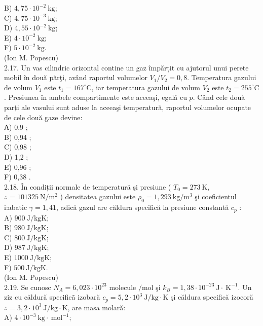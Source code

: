 B) $4,75 \cdot 10^{-2} \mathrm{~kg}$;\\
C) $4,75 \cdot 10^{-3} \mathrm{~kg}$;\\
D) $4,55 \cdot 10^{-2} \mathrm{~kg}$;\\
E) $4 \cdot 10^{-2} \mathrm{~kg}$;\\
F) $5 \cdot 10^{-2} \mathrm{~kg}$.\\
(Ion M. Popescu)\\
2.17. Un vas cilindric orizontal contine un gaz împărțit cu ajutorul unui perete mobil în două părţi, având raportul volumelor $V_{1} / V_{2}=0,8$. Temperatura gazului de volum $V_{1}$ este $t_{1}=167^{\circ} \mathrm{C}$, iar temperatura gazului de volum $V_{2}$ este $t_{2}=255^{\circ} \mathrm{C}$. Presiunea în ambele compartimente este aceeaşi, egalǎ cu $p$. Când cele două parți ale vasului sunt aduse la aceeaşi temperatură, raportul volumelor ocupate de cele două gaze devine:\\
А) 0,9 ;\\
B) 0,94 ;\\
C) 0,98 ;\\
D) 1,2 ;\\
E) 0,96 ;\\
F) 0,38 .\\
2.18. În condiții normale de temperatură şi presiune ( $T_{0}=273 \mathrm{~K}$, $\therefore=101325 \mathrm{~N} / \mathrm{m}^{2}$ ) densitatea gazului este $\rho_{0}=1,293 \mathrm{~kg} / \mathrm{m}^{3}$ şi coeficientul i:abatic $\gamma=1,41$, adică gazul are căldura specifică la presiune constantă $c_{p}$ :\\
A) $900 \mathrm{~J} / \mathrm{kgK}$;\\
B) $980 \mathrm{~J} / \mathrm{kgK}$;\\
C) $800 \mathrm{~J} / \mathrm{kgK}$;\\
D) $987 \mathrm{~J} / \mathrm{kgK}$;\\
E) $1000 \mathrm{~J} / \mathrm{kgK}$;\\
F) $500 \mathrm{~J} / \mathrm{kgK}$.\\
(Ion M. Popescu)\\
2.19. Se cunosc $N_{A}=6,023 \cdot 10^{23}$ molecule $/ \mathrm{mol}$ şi $k_{B}=1,38 \cdot 10^{-23} \mathrm{~J} \cdot \mathrm{~K}^{-1}$. Un ziz cu căldură specificã izobară $c_{p}=5,2 \cdot 10^{3} \mathrm{~J} / \mathrm{kg} \cdot \mathrm{K}$ şi căldura specifică izocoră $\therefore=3,2 \cdot 10^{3} \mathrm{~J} / \mathrm{kg} \cdot \mathrm{K}$, are masa molară:\\
A) $4 \cdot 10^{-3} \mathrm{~kg} \cdot \mathrm{~mol}^{-1}$;\\
